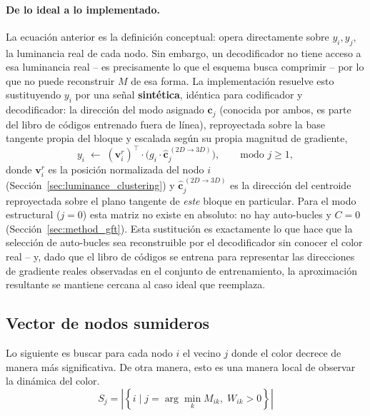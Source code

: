         \paragraph{De lo ideal a lo implementado.} La ecuación anterior es la definición
        conceptual: opera directamente sobre $y_i, y_j$, la luminancia real de cada nodo. Sin
        embargo, un decodificador no tiene acceso a esa luminancia real -- es precisamente lo
        que el esquema busca comprimir -- por lo que no puede reconstruir $M$ de esa forma. La
        implementación resuelve esto sustituyendo $y_i$ por una señal \textbf{sintética},
        idéntica para codificador y decodificador: la dirección del modo asignado $\mathbf{c}_j$
        (conocida por ambos, es parte del libro de códigos entrenado fuera de línea),
        reproyectada sobre la base tangente propia del bloque y escalada según su propia
        magnitud de gradiente,
        \begin{equation}
            y_i \;\leftarrow\; \left(\mathbf{v}_i^{r}\right)^\top \cdot \big(g_i\cdot\hat{\mathbf{c}}_j^{\,(2D\to3D)}\big), \qquad \text{modo } j \geq 1,
        \end{equation}
        donde $\mathbf{v}_i^r$ es la posición normalizada del nodo $i$ (Sección~\ref{sec:luminance_clustering}) y $\hat{\mathbf{c}}_j^{\,(2D\to3D)}$ es la dirección del centroide reproyectada sobre el plano tangente de \emph{este} bloque en particular. Para el modo estructural ($j=0$) esta matriz no existe en absoluto: no hay auto-bucles y $C=0$ (Sección~\ref{sec:method_gft}). Esta sustitución es exactamente lo que hace que la selección de auto-bucles sea reconstruible por el decodificador sin conocer el color real -- y, dado que el libro de códigos se entrena para representar las direcciones de gradiente reales observadas en el conjunto de entrenamiento, la aproximación resultante se mantiene cercana al caso ideal que reemplaza.
            
    \subsection{Vector de nodos sumideros}
        Lo siguiente es buscar para cada nodo $i$ el vecino $j$ donde el color decrece de manera más significativa. De otra manera, esto es una manera local de observar la dinámica del color.
        \begin{equation}
            S_j = \left| \left\{ i \mid j = \arg\min_{k} M_{ik}, \; W_{ik} > 0 \right\} \right|
        \end{equation}

